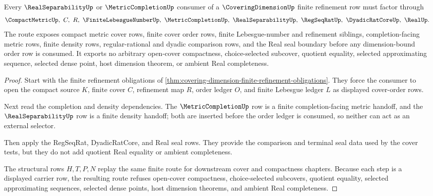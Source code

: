 \begin{theorem}
\label{thm:covering-dimension-real-separability-refinement-route}
Every $\RealSeparabilityUp$ or $\MetricCompletionUp$ consumer of a $\CoveringDimensionUp$ finite refinement row must factor through
$$
\CompactMetricUp,\ C,\ R,\ \FiniteLebesgueNumberUp,\ \MetricCompletionUp,\ \RealSeparabilityUp,\ \RegSeqRatUp,\ \DyadicRatCoreUp,\ \RealUp .
$$
The route exposes compact metric cover rows, finite cover order rows, finite Lebesgue-number and refinement siblings, completion-facing metric rows, finite density rows, regular-rational and dyadic comparison rows, and the Real seal boundary before any dimension-bound order row is consumed. It exports no arbitrary open-cover compactness, choice-selected subcover, quotient equality, selected approximating sequence, selected dense point, host dimension theorem, or ambient Real completeness.
\end{theorem}
\begin{proof}
Start with the finite refinement obligations of \autoref{thm:covering-dimension-finite-refinement-obligations}. They force the consumer to open the compact source $K$, finite cover $C$, refinement map $R$, order ledger $O$, and finite Lebesgue ledger $L$ as displayed cover-order rows.

Next read the completion and density dependencies. The $\MetricCompletionUp$ row is a finite completion-facing metric handoff, and the $\RealSeparabilityUp$ row is a finite density handoff; both are inserted before the order ledger is consumed, so neither can act as an external selector.

Then apply the RegSeqRat, DyadicRatCore, and Real seal rows. They provide the comparison and terminal seal data used by the cover tests, but they do not add quotient Real equality or ambient completeness.

The structural rows $H,T,P,N$ replay the same finite route for downstream cover and compactness chapters. Because each step is a displayed carrier row, the resulting route refuses open-cover compactness, choice-selected subcovers, quotient equality, selected approximating sequences, selected dense points, host dimension theorems, and ambient Real completeness.
\end{proof}

